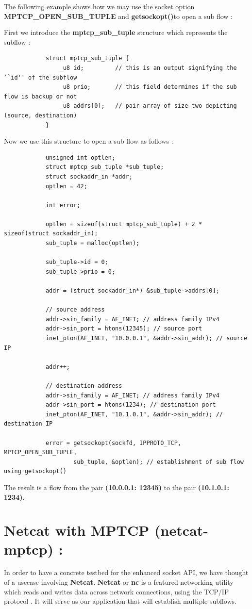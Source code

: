 \documentclass[a4paper,11pt]{article}
\begin{document}
			\raggedright{The following example shows how we may use the socket option \textbf{MPTCP\_OPEN\_SUB\_TUPLE} and \textbf{getsockopt()}to open a sub flow \cite{api}:}

			First we introduce the \textbf{mptcp\_sub\_tuple} structure which represents the subflow :
			\begin{lstlisting}
			struct mptcp_sub_tuple {
				_u8 id;			// this is an output signifying the ``id'' of the subflow
				_u8 prio;		// this field determines if the sub flow is backup or not
				_u8 addrs[0];	// pair array of size two depicting (source, destination)
			}
			\end{lstlisting}
			Now we use this structure to open a sub flow as follows :
			\begin{lstlisting}
   			unsigned int optlen;
   			struct mptcp_sub_tuple *sub_tuple;
   			struct sockaddr_in *addr;
   			optlen = 42;

   			int error;

   			optlen = sizeof(struct mptcp_sub_tuple) + 2 * sizeof(struct sockaddr_in);
   			sub_tuple = malloc(optlen);

   			sub_tuple->id = 0;
   			sub_tuple->prio = 0;

   			addr = (struct sockaddr_in*) &sub_tuple->addrs[0];

   			// source address
   			addr->sin_family = AF_INET; // address family IPv4
   			addr->sin_port = htons(12345); // source port
   			inet_pton(AF_INET, "10.0.0.1", &addr->sin_addr); // source IP

   			addr++;

   			// destination address
   			addr->sin_family = AF_INET; // address family IPv4
   			addr->sin_port = htons(1234); // destination port
   			inet_pton(AF_INET, "10.1.0.1", &addr->sin_addr); // destination IP

   			error = getsockopt(sockfd, IPPROTO_TCP, MPTCP_OPEN_SUB_TUPLE,
                    sub_tuple, &optlen); // establishment of sub flow using getsockopt()
			\end{lstlisting}

		The result is a flow from the pair \textbf{(10.0.0.1: 12345)} to the pair \textbf{(10.1.0.1: 1234)}.

	
	\section{Netcat with MPTCP (netcat-mptcp) :}
		\label{sec:netcat-mptcp}
		In order to have a concrete testbed for the enhanced socket API, we have thought of a usecase involving \textbf{Netcat}. \textbf{Netcat} or \textbf{nc} is a featured networking utility which reads and writes data across network connections, using the TCP/IP protocol \cite{nc}. It will serve as our application that will establish multiple subflows.
\end{document}
